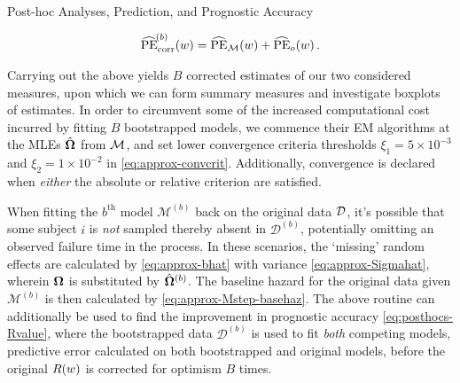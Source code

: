 \begin{chapter}{\label{cha:posthoc}Post-hoc Analyses, Prediction, and Prognostic Accuracy}
\begin{enumerate}
\begin{align*}
        \widehat{\mathrm{PE}}_{\mathrm{corr}}^{\!\left( b \right)}\!\left( w\right) = \widehat{\mathrm{PE}}_{\mathcal{M}}\!\left( w\right) + \widehat{\mathrm{PE}}_{o}\!\left( w\right).
    \end{align*}
\end{enumerate}
Carrying out the above yields $B$ corrected estimates of our two considered measures, upon which we can form summary measures and investigate \eg boxplots of estimates. In order to circumvent some of the increased computational cost incurred by fitting $B$ bootstrapped models, we commence their EM algorithms at the MLEs $\hat{\bm{\Omega}}$ from $\cal M$, and set lower convergence criteria thresholds $\xi_1=5\times10^{-3}$ and $\xi_2=1\times10^{-2}$ in \eqref{eq:approx-convcrit}. Additionally, convergence is declared when \textit{either} the absolute or relative criterion are satisfied.

When fitting the $b^{\mathrm{th}}$ model $\mathcal{M}^{(b)}$ back on the original data $\cal D$, it's possible that some subject $i$ is \textit{not} sampled thereby absent in $\mathcal{D}^{(b)}$, potentially omitting an observed failure time in the process. In these scenarios, the `missing' random effects are calculated by \eqref{eq:approx-bhat} with variance \eqref{eq:approx-Sigmahat}, wherein $\bm{\mathrm{\Omega}}$ is substituted by $\hat{\bm{\Omega}}^{(b)}$. The baseline hazard for the original data given $\mathcal{M}^{(b)}$ is then calculated by \eqref{eq:approx-Mstep-basehaz}. The above routine can additionally be used to find the improvement in prognostic accuracy \eqref{eq:posthocs-Rvalue}, where the bootstrapped data $\mathcal{D}^{(b)}$ is used to fit \textit{both} competing models, predictive error calculated on both bootstrapped and original models, before the original $R\!\left( w\right)$ is corrected for optimism $B$ times.

\end{chapter}